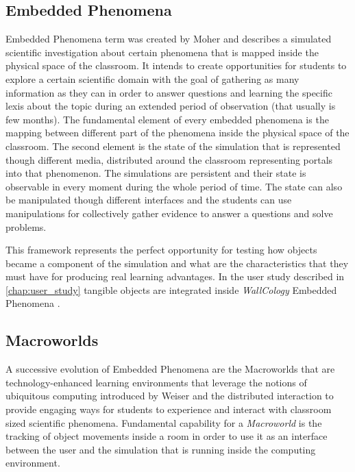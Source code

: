 \subsection {Embedded Phenomena}
Embedded Phenomena term was created by Moher \cite{moher:embedded} and describes a simulated scientific investigation about certain phenomena that is mapped inside the physical space of the classroom. It intends to create opportunities for students to explore a certain scientific domain with the goal of gathering as many information as they can in order to answer questions and learning the specific lexis about the topic during an extended period of observation (that usually is few months). The fundamental element of every embedded phenomena is the mapping between different part of the phenomena inside the physical space of the classroom. The second element is the state of the simulation that is represented though different media, distributed around the classroom representing portals into that phenomenon. The simulations are persistent and their state is observable in every moment during the whole period of time. The state can also be manipulated though different interfaces and the students can use manipulations for collectively gather evidence to answer a questions and solve problems. 

This framework represents the perfect opportunity for testing how objects became a component of the simulation and what are the characteristics that they must have for producing real learning advantages. In the user study described in \autoref{chap:user_study} tangible objects are integrated inside \textit{WallCology} Embedded Phenomena \cite{moher:wallcology}.

\subsection{Macroworlds}

A successive evolution of Embedded Phenomena are the Macroworlds that are technology-enhanced learning environments that leverage the notions of ubiquitous computing introduced by Weiser \cite{weiser:computer} and the distributed interaction \cite{luyten:distributed} to provide engaging ways for students to experience and interact with classroom sized scientific phenomena. Fundamental capability for a \textit{Macroworld} is the tracking of object movements inside a room in order to use it as an interface between the user and the simulation that is running inside the computing environment.


